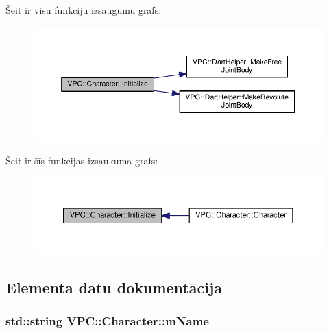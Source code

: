 Šeit ir visu funkciju izsaugumu grafs\+:
\nopagebreak
\begin{figure}[H]
\begin{center}
\leavevmode
\includegraphics[width=350pt]{class_v_p_c_1_1_character_a9fb1410736359fab3877e3afe18f2877_cgraph}
\end{center}
\end{figure}




Šeit ir šīs funkcijas izsaukuma grafs\+:
\nopagebreak
\begin{figure}[H]
\begin{center}
\leavevmode
\includegraphics[width=350pt]{class_v_p_c_1_1_character_a9fb1410736359fab3877e3afe18f2877_icgraph}
\end{center}
\end{figure}




\subsection{Elementa datu dokumentācija}
\subsubsection[{\texorpdfstring{m\+Name}{mName}}]{\setlength{\rightskip}{0pt plus 5cm}std\+::string V\+P\+C\+::\+Character\+::m\+Name\hspace{0.3cm}{\ttfamily [private]}}\hypertarget{class_v_p_c_1_1_character_a66b5e53cb1779993ae7b78e1b29209b5}{}\label{class_v_p_c_1_1_character_a66b5e53cb1779993ae7b78e1b29209b5}


